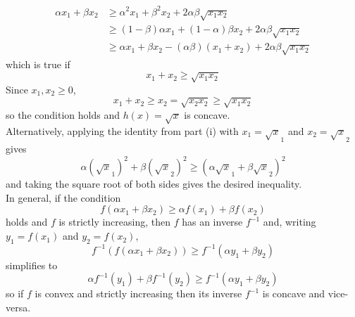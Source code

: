 \documentclass{article}
\begin{document}
{\begin{align*}
\alpha x_1 + \beta x_2 &\geqslant \alpha^2 x_1 + \beta^2 x_2 + 2\alpha\beta \sqrt{x_1 x_2}\\
&\geqslant (1-\beta)\alpha x_1 + (1-\alpha)\beta x_2 + 2\alpha\beta \sqrt{x_1 x_2} \\
&\geqslant \alpha x_1 + \beta x_2 -(\alpha\beta)(x_1 + x_2) + 2\alpha\beta\sqrt{x_1 x_2}
\end{align*}
which is true if 
$$x_1 + x_2 \geqslant \sqrt{x_1 x_2}$$
Since $x_1, x_2 \geqslant 0$,
$$x_1 + x_2 \geqslant x_2 = \sqrt{ x_2 x_2} \geqslant \sqrt{x_1 x_2}$$
so the condition holds and $h(x) = \sqrt x$ is concave. \\
\indent Alternatively, applying the identity from part (i) with $x_1 = \sqrt x_1$ and $x_2 = \sqrt x_2$ gives
$$\alpha (\sqrt x_1)^2 + \beta (\sqrt x_2)^2 \geqslant (\alpha\sqrt x_1+ \beta\sqrt x_2)^2$$ 
and taking the square root of both sides gives the desired inequality. \\ %
\indent In general, if the condition 
$$f(\alpha x_1 + \beta x_2) \geqslant \alpha f(x_1) + \beta f(x_2)$$ 
holds and $f$ is strictly increasing, then $f$ has an inverse $f^{-1}$ and, writing $y_1 = f(x_1)$ and $y_2 =  f(x_2)$,
$$f^{-1}(f(\alpha x_1 + \beta x_2)) \geqslant f^{-1}(\alpha y_1 + \beta y_2)$$
simplifies to  
$$\alpha f^{-1}(y_1) + \beta f^{-1}(y_2) \geqslant f^{-1}(\alpha y_1 + \beta y_2)$$
so if $f$ is convex and strictly increasing then its inverse $f^{-1}$ is concave and vice-versa.} %

\newpage
\end{document}
